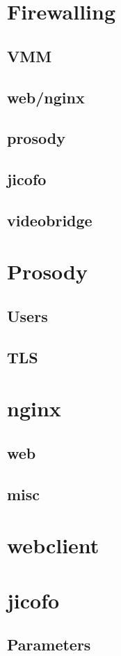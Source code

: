 \documentclass[conference]{IEEEtran}
\begin{document}
\section{Firewalling}
\subsection{VMM}
\subsection{web/nginx}
\subsection{prosody}
\subsection{jicofo}
\subsection{videobridge}
\section{Prosody}
\subsection{Users}
\subsection{TLS}
\section{nginx}
\subsection{web}
\subsection{misc}
\section{webclient}
\section{jicofo}
\subsection{Parameters}
\end{document}
